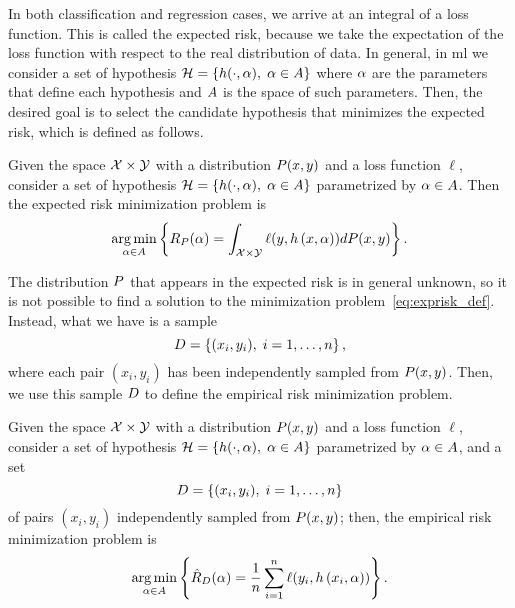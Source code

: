 %
In both classification and regression cases, we arrive at an integral of a loss function.
This is called the expected risk, because we take the expectation of the loss function with respect to the real distribution of data. 
%
In general, in \acrshort{ml} we consider a set of hypothesis $\mathcal{H} = \left\{h(\cdot, \alpha),\; \alpha \in A\right\}$ where $\alpha$ are the parameters that define each hypothesis and $A$ is the space of such parameters. Then, the desired goal is to select the candidate hypothesis that minimizes the expected risk, which is defined as follows.
%
\begin{definition}
    Given the space $\mathcal{X} \times \mathcal{Y}$ with a distribution $P(x, y)$ and a loss function $\ell$, consider a set of hypothesis $\mathcal{H} = \left\{h(\cdot, \alpha),\; \alpha \in A\right\}$ parametrized by $\alpha \in A$. Then the expected risk minimization problem is 
    \begin{equation}
        \label{eq:exprisk_def}
        \argmin_{\param \in \paramspace} \left\{ \exprisk(\param) = \int_{\Xspace \times \Yspace} \ell(y, \hyp{x}{\param}) d\distf(x, y) \right\} .
    \end{equation}
\end{definition}
%
The distribution $P$ that appears in the expected risk is in general unknown, so it is not possible to find a solution to the minimization problem~\eqref{eq:exprisk_def}.
% 
Instead, what we have is a sample 
\begin{equation}
    \nonumber
    D = \left\{(x_i, y_i), \; i=1, \ldots, n\right\} ,
\end{equation}
where each pair $(x_i, y_i)$ has been independently sampled from $P(x, y)$. 
%
Then, we use this sample $D$ to define the empirical risk minimization problem.
%
\begin{definition}
    Given the space $\mathcal{X} \times \mathcal{Y}$ with a distribution $P(x, y)$ and a loss function $\ell$, consider a set of hypothesis $\mathcal{H} = \left\{h(\cdot, \alpha),\; \alpha \in A\right\}$ parametrized by $\alpha \in A$, and a set 
    \begin{equation}
        \nonumber
        D = \left\{(x_i, y_i), \; i=1, \ldots, n\right\}
    \end{equation}
    of pairs $(x_i, y_i)$ independently sampled from $P(x, y)$;    
    then, the empirical risk minimization problem is 
    \begin{equation}
        \label{eq:emprisk_def}
        \argmin_{\param \in \paramspace} \left\{ \emprisk(\param) = \frac{1}{\nsamples} \sum_{i=1}^\nsamples \ell(y_i, \hyp{x_i}{\param}) \right\}.
    \end{equation}
\end{definition}
